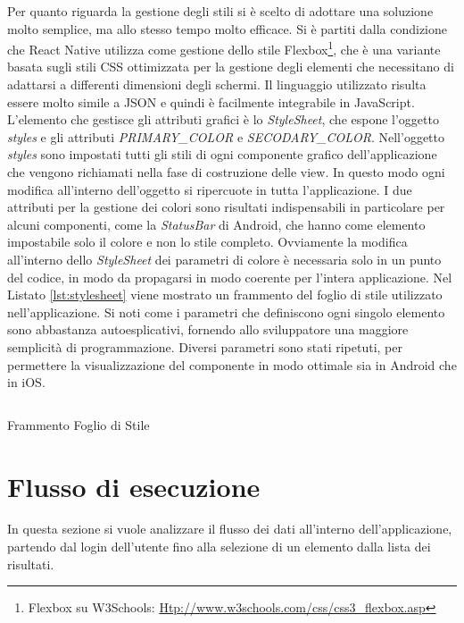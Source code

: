 Per quanto riguarda la gestione degli stili si è scelto di adottare una soluzione molto semplice, ma allo stesso tempo molto efficace. Si è partiti dalla condizione che React Native utilizza come gestione dello stile Flexbox\footnote{Flexbox su W3Schools: \url{Htp://www.w3schools.com/css/css3_flexbox.asp}}, che è una variante basata sugli stili CSS ottimizzata per la gestione degli elementi che necessitano di adattarsi a differenti dimensioni degli schermi. Il linguaggio utilizzato risulta essere molto simile a JSON e quindi è facilmente integrabile in JavaScript. L'elemento che gestisce gli attributi grafici è lo \emph{StyleSheet}, che espone l'oggetto \emph{styles} e gli attributi \emph{PRIMARY\_COLOR} e \emph{SECODARY\_COLOR}.
Nell'oggetto \emph{styles} sono impostati tutti gli stili di ogni componente grafico dell'applicazione che vengono richiamati nella fase di costruzione delle view. In questo modo ogni modifica all'interno dell'oggetto si ripercuote in tutta l'applicazione.
I due attributi per la gestione dei colori sono risultati indispensabili in particolare per alcuni componenti, come la \emph{StatusBar} di Android, che hanno come elemento impostabile solo il colore e non lo stile completo. Ovviamente la modifica all'interno dello \emph{StyleSheet} dei parametri di colore è necessaria solo in un punto del codice, in modo da propagarsi in modo coerente per l'intera applicazione.
Nel Listato \ref{lst:stylesheet} viene mostrato un frammento del foglio di stile utilizzato nell'applicazione. Si noti come i parametri che definiscono ogni singolo elemento sono abbastanza autoesplicativi, fornendo allo sviluppatore una maggiore semplicità di programmazione. Diversi parametri sono stati ripetuti, per permettere la visualizzazione del componente in modo ottimale sia in Android che in iOS.

\begin{listing}[H]
	\inputminted{js}{6-implementazione-app/Codice/stylesheet.js}
	\caption{Frammento Foglio di Stile}
	\label{lst:stylesheet}
\end{listing}
 
\section{Flusso di esecuzione}

In questa sezione si vuole analizzare il flusso dei dati all'interno dell'applicazione, partendo dal login dell'utente fino alla selezione di un elemento dalla lista dei risultati.

